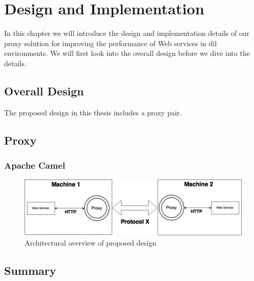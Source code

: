 \chapter{Design and Implementation}

In this chapter we will introduce the design and implementation details of our proxy solution for improving the performance of Web services in dil environments. We will first look into the overall design before we dive into the details.

\section{Overall Design}

The proposed design in this thesis includes a proxy pair.


\section{Proxy}

\subsection{Apache Camel}

\begin{figure}[h]
\includegraphics[scale=0.4]{images/architecture.png}
\caption{Architectural overview of proposed design}
\end{figure}


\section{Summary}
